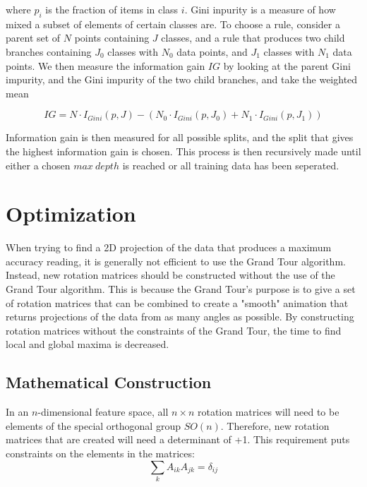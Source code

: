 \documentclass[a4paper,11pt,twoside]{article}
\begin{document}
where $p_i$ is the fraction of items in class $i$. Gini inpurity is a measure of how mixed a subset of elements of certain classes are. To choose a rule, consider a parent set of $N$ points containing $J$ classes, and a rule that produces two child branches containing $J_0$ classes with $N_0$ data points, and $J_1$ classes with $N_1$ data points. We then measure the information gain $IG$ by looking at the parent Gini impurity, and the Gini impurity of the two child branches, and take the weighted mean

\begin{equation}
IG= N\cdot I_{Gini}(p, J) - (N_0\cdot I_{Gini}(p, J_0) + N_1\cdot I_{Gini}(p, J_1))
\end{equation}

Information gain is then measured for all possible splits, and the split that gives the highest information gain is chosen. This process is then recursively made until either a chosen $max\ depth$ is reached or all training data has been seperated.  

\newpage
\section{Optimization}

When trying to find a 2D projection of the data that produces a maximum accuracy reading, it is generally not efficient to use the Grand Tour algorithm. Instead, new rotation matrices should be constructed without the use of the Grand Tour algorithm. This is because the Grand Tour's purpose is to give a set of rotation matrices that can be combined to create a "smooth" animation that returns projections of the data from as many angles as possible. By constructing rotation matrices without the constraints of the Grand Tour, the time to find local and global maxima is decreased.

\subsection{Mathematical Construction}

In an $n$-dimensional feature space, all $n\times n$ rotation matrices will need to be elements of the special orthogonal group $SO(n)$. Therefore, new rotation matrices that are created will need a determinant of +1. This requirement puts constraints on the elements in the matrices:
\begin{equation}
\sum_{k}A_{ik}A_{jk} = \delta_{ij}
\end{equation}
\end{document}
